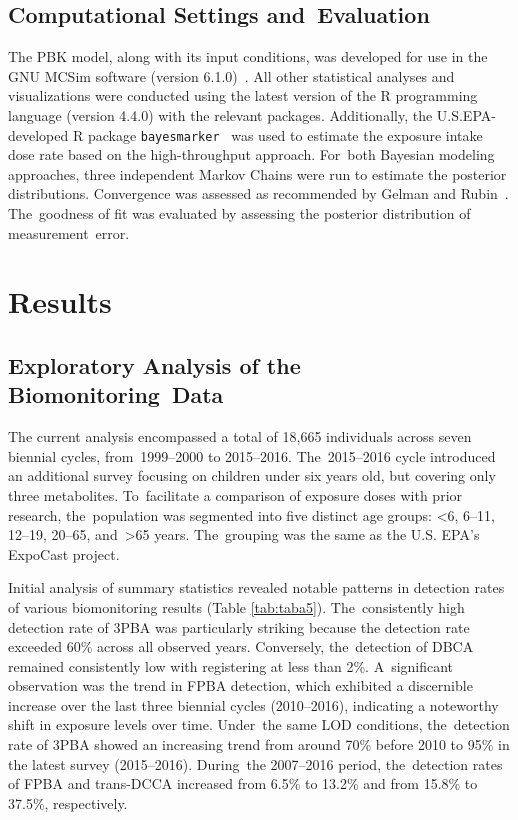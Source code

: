 \documentclass[toxics,article,accept,pdftex,moreauthors]{Definitions/mdpi}
\begin{document}
\subsection{Computational Settings and~Evaluation}\label{computational-settings-and-evaluation}

The PBK model, along with its input conditions, was developed for use in the
GNU MCSim software (version 6.1.0)~\citep{bois_gnu_2009}. All other statistical
analyses and visualizations were conducted using the latest version of the R
programming language (version 4.4.0) with the relevant packages. Additionally,
the U.S.EPA-developed R package \texttt{bayesmarker}~\citep{stanfield2022bayesian} was
used to estimate the exposure intake dose rate based on the high-throughput
approach. For~both Bayesian modeling approaches, three independent Markov
Chains were run to estimate the posterior distributions. Convergence was
assessed as recommended by Gelman and Rubin~\citep{gelman1992inference}. The~goodness of fit was evaluated by assessing the posterior distribution of
measurement~error. 

\section{Results}\label{results}
\unskip

\subsection{Exploratory Analysis of the Biomonitoring~Data}\label{exploratory-analysis-of-the-biomonitoring-data}

The current analysis encompassed a total of 18,665 individuals across
seven biennial cycles, from~1999--2000 to 2015--2016. The~2015--2016 cycle
introduced an additional survey focusing on children under six years old,
but covering only three metabolites. To~facilitate a comparison of
exposure doses with prior research, the~population was segmented into
five distinct age groups: \textless6, 6--11, 12--19, 20--65, and~\textgreater65 years. The~grouping was the same as the U.S. EPA's ExpoCast
project.

Initial analysis of summary statistics revealed notable patterns in
detection rates of various biomonitoring results (Table
\ref{tab:taba5}). The~consistently high detection rate of 3PBA was
particularly striking because the detection rate exceeded 60\% across all
observed years. Conversely, the~detection of DBCA remained consistently
low with registering at less than 2\%. A~significant
observation was the trend in FPBA detection, which exhibited a
discernible increase over the last three biennial cycles (2010--2016),
indicating a noteworthy shift in exposure levels over time. Under~the
same LOD conditions, the~detection rate of 3PBA showed an increasing
trend from around 70\% before 2010 to 95\% in the latest survey
(2015--2016). During~the 2007--2016 period, the~detection rates of FPBA
and trans-DCCA increased from 6.5\% to 13.2\% and from 15.8\% to 37.5\%,
respectively.
\end{document}
